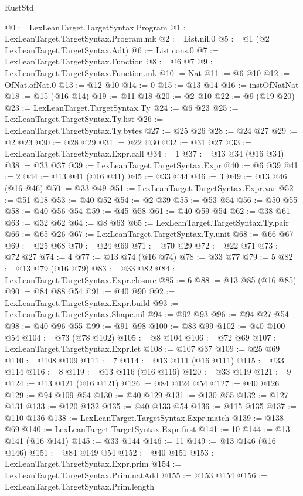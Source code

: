 \begin{lexlean}{RustStd}
\begin{coremodule}
{\begin{coremodule}
{{{{{{{{{{{{{{{{{{{{{{{{{{{{{{{{{{{@0 := LexLeanTarget.TargetSyntax.Program
@1 := LexLeanTarget.TargetSyntax.Program.mk
@2 := List.nil.{0}
@5 := @1 (@2 LexLeanTarget.TargetSyntax.Adt)
@6 := List.cons.{0}
@7 := LexLeanTarget.TargetSyntax.Function
@8 := @6 @7
@9 := LexLeanTarget.TargetSyntax.Function.mk
@10 := Nat
@11 := @6 @10
@12 := OfNat.ofNat.{0}
@13 := @12 @10
@14 := 0
@15 := @13 @14
@16 := instOfNatNat
@18 := @15 (@16 @14)
@19 := @11 @18
@20 := @2 @10
@22 := @9 (@19 @20)
@23 := LexLeanTarget.TargetSyntax.Ty
@24 := @6 @23
@25 := LexLeanTarget.TargetSyntax.Ty.list
@26 := LexLeanTarget.TargetSyntax.Ty.bytes
@27 := @25 @26
@28 := @24 @27
@29 := @2 @23
@30 := @28 @29
@31 := @22 @30
@32 := @31 @27
@33 := LexLeanTarget.TargetSyntax.Expr.call
@34 := 1
@37 := @13 @34 (@16 @34)
@38 := @33 @37
@39 := LexLeanTarget.TargetSyntax.Expr
@40 := @6 @39
@41 := 2
@44 := @13 @41 (@16 @41)
@45 := @33 @44
@46 := 3
@49 := @13 @46 (@16 @46)
@50 := @33 @49
@51 := LexLeanTarget.TargetSyntax.Expr.var
@52 := @51 @18
@53 := @40 @52
@54 := @2 @39
@55 := @53 @54
@56 := @50 @55
@58 := @40 @56 @54
@59 := @45 @58
@61 := @40 @59 @54
@62 := @38 @61
@63 := @32 @62
@64 := @8 @63
@65 := LexLeanTarget.TargetSyntax.Ty.pair
@66 := @65 @26
@67 := LexLeanTarget.TargetSyntax.Ty.unit
@68 := @66 @67
@69 := @25 @68
@70 := @24 @69
@71 := @70 @29
@72 := @22 @71
@73 := @72 @27
@74 := 4
@77 := @13 @74 (@16 @74)
@78 := @33 @77
@79 := 5
@82 := @13 @79 (@16 @79)
@83 := @33 @82
@84 := LexLeanTarget.TargetSyntax.Expr.closure
@85 := 6
@88 := @13 @85 (@16 @85)
@90 := @84 @88 @54
@91 := @40 @90
@92 := LexLeanTarget.TargetSyntax.Expr.build
@93 := LexLeanTarget.TargetSyntax.Shape.nil
@94 := @92 @93
@96 := @94 @27 @54
@98 := @40 @96 @55
@99 := @91 @98
@100 := @83 @99
@102 := @40 @100 @54
@104 := @73 (@78 @102)
@105 := @8 @104
@106 := @72 @69
@107 := LexLeanTarget.TargetSyntax.Expr.let
@108 := @107 @37
@109 := @25 @69
@110 := @108 @109
@111 := 7
@114 := @13 @111 (@16 @111)
@115 := @33 @114
@116 := 8
@119 := @13 @116 (@16 @116)
@120 := @33 @119
@121 := 9
@124 := @13 @121 (@16 @121)
@126 := @84 @124 @54
@127 := @40 @126
@129 := @94 @109 @54
@130 := @40 @129
@131 := @130 @55
@132 := @127 @131
@133 := @120 @132
@135 := @40 @133 @54
@136 := @115 @135
@137 := @110 @136
@138 := LexLeanTarget.TargetSyntax.Expr.match
@139 := @138 @69
@140 := LexLeanTarget.TargetSyntax.Expr.first
@141 := 10
@144 := @13 @141 (@16 @141)
@145 := @33 @144
@146 := 11
@149 := @13 @146 (@16 @146)
@151 := @84 @149 @54
@152 := @40 @151
@153 := LexLeanTarget.TargetSyntax.Expr.prim
@154 := LexLeanTarget.TargetSyntax.Prim.natAdd
@155 := @153 @154
@156 := LexLeanTarget.TargetSyntax.Prim.length
}}}}}}}}}}}}}}}}}}}}}}}}}}}}}}}}}}}
\end{coremodule}}
\end{coremodule}
\end{lexlean}
